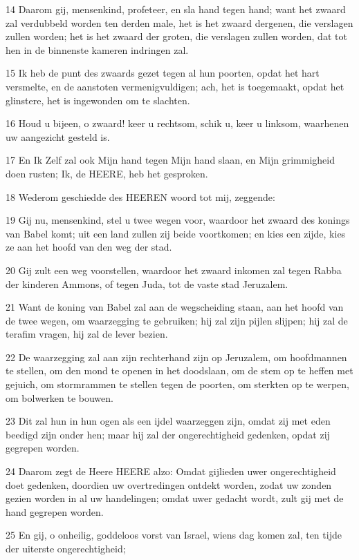 \par 14 Daarom gij, mensenkind, profeteer, en sla hand tegen hand; want het zwaard zal verdubbeld worden ten derden male, het is het zwaard dergenen, die verslagen zullen worden; het is het zwaard der groten, die verslagen zullen worden, dat tot hen in de binnenste kameren indringen zal.
\par 15 Ik heb de punt des zwaards gezet tegen al hun poorten, opdat het hart versmelte, en de aanstoten vermenigvuldigen; ach, het is toegemaakt, opdat het glinstere, het is ingewonden om te slachten.
\par 16 Houd u bijeen, o zwaard! keer u rechtsom, schik u, keer u linksom, waarhenen uw aangezicht gesteld is.
\par 17 En Ik Zelf zal ook Mijn hand tegen Mijn hand slaan, en Mijn grimmigheid doen rusten; Ik, de HEERE, heb het gesproken.
\par 18 Wederom geschiedde des HEEREN woord tot mij, zeggende:
\par 19 Gij nu, mensenkind, stel u twee wegen voor, waardoor het zwaard des konings van Babel komt; uit een land zullen zij beide voortkomen; en kies een zijde, kies ze aan het hoofd van den weg der stad.
\par 20 Gij zult een weg voorstellen, waardoor het zwaard inkomen zal tegen Rabba der kinderen Ammons, of tegen Juda, tot de vaste stad Jeruzalem.
\par 21 Want de koning van Babel zal aan de wegscheiding staan, aan het hoofd van de twee wegen, om waarzegging te gebruiken; hij zal zijn pijlen slijpen; hij zal de terafim vragen, hij zal de lever bezien.
\par 22 De waarzegging zal aan zijn rechterhand zijn op Jeruzalem, om hoofdmannen te stellen, om den mond te openen in het doodslaan, om de stem op te heffen met gejuich, om stormrammen te stellen tegen de poorten, om sterkten op te werpen, om bolwerken te bouwen.
\par 23 Dit zal hun in hun ogen als een ijdel waarzeggen zijn, omdat zij met eden beedigd zijn onder hen; maar hij zal der ongerechtigheid gedenken, opdat zij gegrepen worden.
\par 24 Daarom zegt de Heere HEERE alzo: Omdat gijlieden uwer ongerechtigheid doet gedenken, doordien uw overtredingen ontdekt worden, zodat uw zonden gezien worden in al uw handelingen; omdat uwer gedacht wordt, zult gij met de hand gegrepen worden.
\par 25 En gij, o onheilig, goddeloos vorst van Israel, wiens dag komen zal, ten tijde der uiterste ongerechtigheid;
